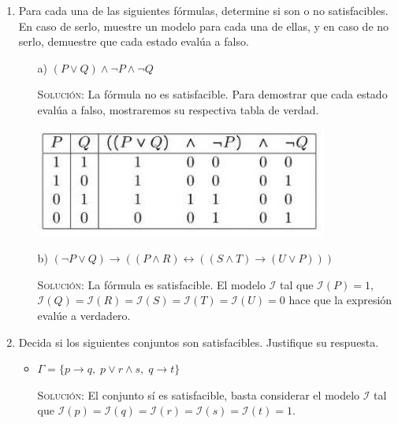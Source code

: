 \documentclass[letterpaper,11pt]{article}
\begin{document}
\begin{enumerate}
    \item Para cada una de las siguientes fórmulas, determine si son o no 
    satisfacibles. En caso de serlo, muestre un modelo para cada una de ellas,
    y en caso de no serlo, demuestre que cada estado evalúa a falso.

    \begin{itemize}
        \item[a)] $(P \lor Q) \land \neg P \land \neg Q$ 

        \textsc{Solución:} La fórmula no es satisfacible. Para demostrar que 
        cada estado evalúa a falso, mostraremos su respectiva tabla de verdad.

        \begin{center}
            \centerline{\includegraphics[scale=0.7]{tabla.jpg}}
        \end{center}

        \item[b)] $(\neg P \lor Q) → ((P \land R) ↔ ((S \land T) → (U \lor P)))$

        \textsc{Solución:} La fórmula es satisfacible. El modelo $\mathcal{I}$
        tal que $\mathcal{I}(P) = 1$, $\mathcal{I}(Q) = \mathcal{I}(R) = 
        \mathcal{I}(S) = \mathcal{I}(T) = \mathcal{I}(U) = 0$ hace 
        que la expresión evalúe a verdadero.
    \end{itemize}

    \item Decida si los siguientes conjuntos son satisfacibles. Justifique 
    su respuesta.

    \begin{itemize}
        \item $\Gamma = \{p → q, \; p \lor r \land s, \; q → t\}$

        \textsc{Solución:} El conjunto sí es satisfacible, basta considerar el 
        modelo $\mathcal{I}$ tal que $\mathcal{I}(p) = \mathcal{I}(q) = 
        \mathcal{I}(r) = \mathcal{I}(s) = \mathcal{I}(t) = 1$.


\end{itemize}
\end{enumerate}
\end{document}
